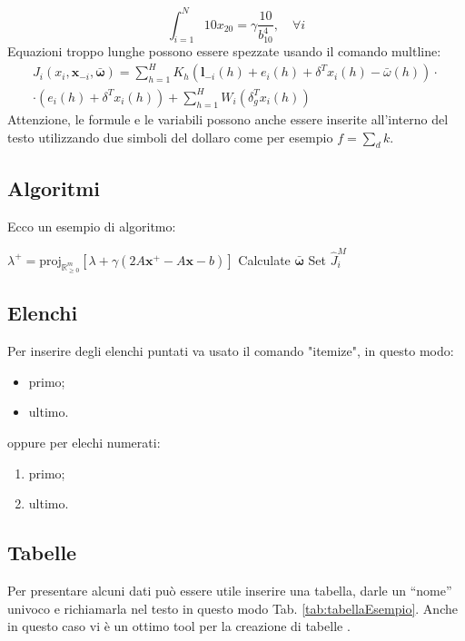 \begin{equation} 
\label{eq:equazioneEsempio}
\int_{i=1}^{N}10x_{20}=\gamma \frac{10}{b_{10}^{4}}, \quad \forall i
\end{equation}
Equazioni troppo lunghe possono essere spezzate usando il comando multline:
\begin{multline}
J_i(x_{i},\boldsymbol {x}_{-i} ,\boldsymbol {\bar{\omega}})  =\sum_{h=1}^{H} K_{h} (\boldsymbol l_{-i}(h) + e_i(h) + \delta^{T} x_{i}(h)- \bar{\omega}(h)) \cdot 
\\
 \cdot (e_i(h) +\delta^{T} x_{i}(h))  + \sum_{h=1}^{H} W_{i} (\delta_{g}^{T} x_{i}(h))
\label{eq:equazioneEsempioLunga}
\end{multline}
Attenzione, le formule e le variabili possono anche essere inserite all'interno del testo utilizzando due simboli del dollaro come per esempio $f = \sum_d k$.

\subsection{Algoritmi}
Ecco un esempio di algoritmo:
\begin{algorithm}[H]
\caption{Nome dell'algoritmo}
\begin{algorithmic}
\STATE $\lambda^{+} = \mathrm{proj}_{\mathbb{R}^m_{\geq 0}}\left [ \lambda +\gamma \left (2A\boldsymbol{x}^{+}-A\boldsymbol{x}-b \right ) \right ]$
\STATE Calculate $\boldsymbol{\bar{\omega}}$
\STATE Set $\hat{J}_i^M$ 
\ENDIF
\ENDFOR
\end{algorithmic}
\end{algorithm} 

\subsection{Elenchi }
Per inserire degli elenchi puntati va usato il comando "itemize", in questo modo:
\begin{itemize}
\item primo;
\item ultimo.
\end{itemize}
oppure per elechi numerati:
\begin{enumerate}
\item primo;
\item ultimo.
\end{enumerate}

\subsection{Tabelle}
Per presentare alcuni dati può essere utile inserire una tabella, darle un “nome” univoco e richiamarla nel testo in questo modo Tab. \ref{tab:tabellaEsempio}. Anche in questo caso vi è un ottimo tool per la creazione di tabelle \cite{CreateLaTexTable}.

